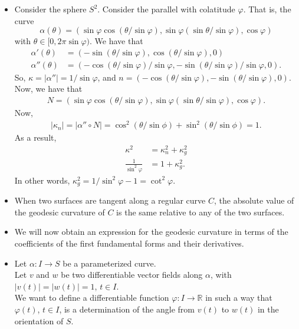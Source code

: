 \documentclass[10pt]{article}
\newcommand{\ra}{\rightarrow}
\newcommand{\Real}{\mathbb{R}}
\begin{document}
\begin{itemize}
    \item Consider the sphere $S^2$. Consider the parallel with colatitude $\varphi$. That is, the curve $$\alpha(\theta) = (\sin \varphi \cos (\theta / \sin\varphi), \sin \varphi (\sin \theta / \sin\varphi), \cos \varphi)$$ with $\theta \in [0,2\pi \sin \varphi)$. We have that
    \begin{align*}
      \alpha'(\theta) &= (-\sin (\theta / \sin\varphi), \cos (\theta / \sin \varphi), 0)\\
      \alpha''(\theta) &= (-\cos (\theta / \sin\varphi) / \sin\varphi, -\sin (\theta / \sin \varphi) / \sin\varphi, 0).
    \end{align*}
    So, $\kappa = |\alpha''| = 1/\sin\varphi$, and $n = (-\cos(\theta/\sin\varphi), -\sin(\theta/\sin\varphi), 0)$. Now, we have that
    \begin{align*}
      N = (\sin \varphi \cos (\theta / \sin\varphi), \sin \varphi (\sin \theta / \sin\varphi), \cos \varphi).
    \end{align*}
    Now,
    \begin{align*}
      |\kappa_n| = |\alpha'' \circ N| = \cos^2 (\theta/\sin\phi) + \sin^2 (\theta / \sin\phi) = 1.
    \end{align*}
    As a result,
    \begin{align*}
      \kappa^2 &= \kappa_n^2 + \kappa^2_g\\
      \frac{1}{\sin^2 \varphi} &= 1 + \kappa^2_g.
    \end{align*}
    In other words, $\kappa^2_g = 1/\sin^2 \varphi - 1 = \cot^2 \varphi$.

    \item When two surfaces are tangent along a regular curve $C$, the absolute value of the geodesic curvature of $C$ is the same relative to any of the two surfaces.

    \item We will now obtain an expression for the geodesic curvature in terms of the coefficients of the first fundamental forms and their derivatives.

    \item Let $\alpha : I \ra S$ be a parameterized curve.\\
    Let $v$ and $w$ be two differentiable vector fields along $\alpha$, with $|v(t)| = |w(t)| = 1$, $t \in I$.\\
    We want to define a differentiable function $\varphi : I \ra \Real$ in such a way that\\
    $\varphi(t)$, $t \in I$, is a determination of the angle from $v(t)$ to $w(t)$ in the orientation of $S$.


\end{itemize}
\end{document}
